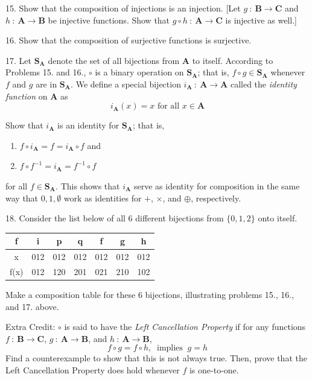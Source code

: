 \documentclass{article}
\newcommand\A{\mathbf A}
\newcommand\B{\mathbf B}
\newcommand\C{\mathbf C}
\newcommand\Sb{\mathbf S}
\newcommand{\0}{\mathbf 0}
\newcommand{\1}{\mathbf 1}
\begin{document}
\begin{description}
  \item{15.} Show that the composition of injections is an injection. [Let $g\ :\ \B \to \C$ and $h\ :\ \A \to \B$ be injective functions. Show that $g \circ h\ :\ \A \to \C$ is injective as well.]

  \item{16.} Show that the composition of surjective functions is surjective.

  \item{17.} Let $\Sb_{\A}$ denote the set of all bijections from $\A$ to itself. According to Problems 15. and 16., $\circ$ is a binary operation on $\Sb_{\A}$; that is, $f \circ g \in \Sb_{\A}$ whenever $f$ and $g$ are in $\Sb_{\A}$. We define a special bijection $i_{\A}\ :\ \A \to \A$ called the \emph{identity function} on $\A$ as
    \begin{equation*}
    i_{\A}(x) = x \text{ for all } x \in \A
    \end{equation*}

    Show that $i_{\A}$ is an identity for $\Sb_{\A}$; that is,
    \begin{enumerate}[\hspace{1cm}(i)]
      \item $f \circ i_{\A} = f = i_{\A} \circ f$ and
      \item $f \circ f^{-1} = i_{\A} = f^{-1} \circ f$
    \end{enumerate}
    for all $f \in \Sb_{\A}$. This shows that $i_{\A}$ serve as identity for composition in the same way that $0, 1, \emptyset$ work as identities for $+$, $\times$, and $\oplus$, respectively.

  \item{18.} Consider the list below of all 6 different bijections from $\{0,1,2\}$ onto itself.

    \begin{center}
    \begin{tabular}{||c||c|c|c|c|c|c||}
    \hline
      f  &  i  &  p  &  q  &  f  &  g  &  h  \\ 
    \hline
    \hline
      x  & 012 & 012 & 012 & 012 & 012 & 012 \\ 
    \hline
    f(x) & 012 & 120 & 201 & 021 & 210 & 102 \\ 
    \hline
    \end{tabular}
    \end{center}

    Make a composition table for these 6 bijections, illustrating problems 15., 16., and 17. above.

  \item{Extra Credit:} $\circ$ is said to have the \emph{Left Cancellation Property} if for any functions $f\ :\ \B \to \C$, $g\ :\ \A \to \B$, and $h\ :\ \A \to \B$,
    \begin{equation*}
    f \circ g = f \circ h,\ \text{ implies }\ g = h
    \end{equation*}
    Find a counterexample to show that this is not always true. Then, prove that the Left Cancellation Property does hold whenever $f$ is one-to-one.

\end{description}
\end{document}
